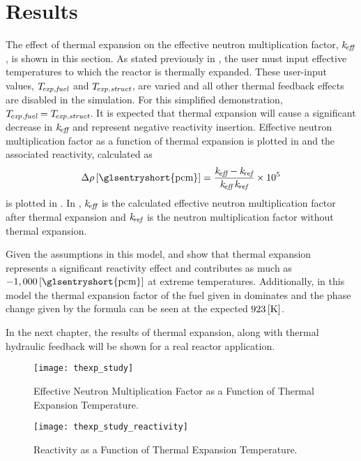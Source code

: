 \section{Results}
  The effect of thermal expansion on the effective neutron multiplication
  factor, $k_{\!\mbox{\scriptsize \em eff}}$, is shown in this section. As stated previously in
  , the user must input effective temperatures to which
  the reactor is thermally expanded. These user-input values, ${T_{\!\mbox{\scriptsize \em exp,fuel}}}$ and
  $T_{\!\mbox{\scriptsize \em exp,struct}}$, are varied and all other thermal feedback effects are disabled
  in the simulation. For this simplified demonstration, ${T_{\!\mbox{\scriptsize \em exp,fuel}}}=T_{\!\mbox{\scriptsize \em exp,struct}}$.
  It is expected that thermal expansion will cause a significant decrease in
  $k_{\!\mbox{\scriptsize \em eff}}$ and represent negative reactivity insertion. Effective neutron
  multiplication factor as a function of thermal expansion is plotted in
   and the associated reactivity, calculated as
  \begin{equation}
    \label{eq:reactivity_formula}
    \Delta \rho \units{\glsentryshort{pcm}} = 
      \frac{\keff - \kref}{\keff \, \kref} \times 10^5
  \end{equation}
  is plotted in . In
  , $k_{\!\mbox{\scriptsize \em eff}}$ is the calculated effective neutron
  multiplication factor after thermal expansion and $k_{\!\mbox{\scriptsize \em ref}}$ is the neutron
  multiplication factor without thermal expansion. 

  Given the assumptions in this model,  and
   show that thermal expansion represents a
  significant reactivity effect and contributes as much as $-1,000
  \units{\glsentryshort{pcm}}$ at extreme temperatures. Additionally, in this
  model the thermal expansion factor of the fuel given in 
  dominates and the phase change given by the formula can be seen at the
  expected $923 \left[\text{{K}}\right]$.

  In the next chapter, the results of thermal expansion, along with thermal
  hydraulic feedback will be shown for a real reactor application.

  \begin{figure}
    \centering
    \texttt{[image: thexp\_study]}
    \caption{Effective Neutron Multiplication Factor as a Function of 
      Thermal Expansion Temperature.}
    \label{fig:thexp_study}
  \end{figure}

  \begin{figure}
    \centering
    \texttt{[image: thexp\_study\_reactivity]}
    \caption{Reactivity as a Function of Thermal Expansion Temperature.}
    \label{fig:thexp_study_reactivity}
  \end{figure}
